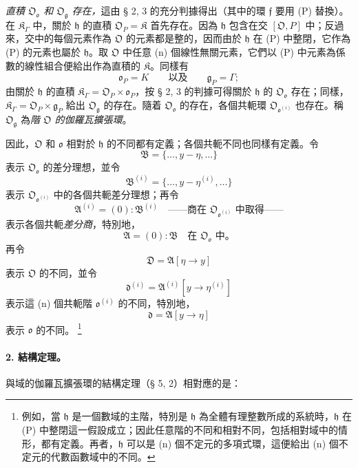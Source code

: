 \documentclass[11pt]{article}
\providecommand{\srcfn}[2]{%
  \begingroup
  \renewcommand{\thefootnote}{#1}%
  \footnote{#2}%
  \addtocounter{footnote}{-1}%
  \endgroup}
\begin{document}
\emph{直積 \(\mathfrak O_{\mathfrak o}\) 和 \(\mathfrak O_{\mathfrak g}\) 存在，}這由 § 2, 3 的充分判據得出（其中的環 \(\mathfrak f\) 要用 (P) 替換）。在 \(\mathfrak K_\Gamma\) 中，關於 \(\mathfrak h\) 的直積 \(\mathfrak O_P=\mathfrak K\) 首先存在。因為 \(\mathfrak h\) 包含在交 \([\mathfrak O,P]\) 中；反過來，交中的每個元素作為 \(\mathfrak O\) 的元素都是整的，因而由於 \(\mathfrak h\) 在 (P) 中整閉，它作為 (P) 的元素也屬於 \(\mathfrak h\)。取 \(\mathfrak O\) 中任意 (n) 個線性無關元素，它們以 (P) 中元素為係數的線性組合便給出作為直積的 \(\mathfrak K\)。同樣有
\[
\mathfrak o_P=K
\qquad\text{以及}\qquad
\mathfrak g_P=\Gamma;
\]
由關於 \(\mathfrak h\) 的直積 \(\mathfrak K_\Gamma=\mathfrak O_P\times\mathfrak o_P\)，按 § 2, 3 的判據可得關於 \(\mathfrak h\) 的 \(\mathfrak O_{\mathfrak o}\) 存在；同樣，\(\mathfrak K_\Gamma=\mathfrak O_P\times\mathfrak g_P\) 給出 \(\mathfrak O_{\mathfrak g}\) 的存在。隨着 \(\mathfrak O_{\mathfrak o}\) 的存在，各個共軛環 \(\mathfrak O_{\mathfrak o^{(i)}}\) 也存在。稱 \(\mathfrak O_{\mathfrak g}\) 為\emph{階 \(\mathfrak O\) 的伽羅瓦擴張環}。

因此，\(\mathfrak O\) 和 \(\mathfrak o\) 相對於 \(\mathfrak h\) 的不同都有定義；各個共軛不同也同樣有定義。令
\[
\mathfrak B=\{\ldots,y-\eta,\ldots\}
\]
表示 \(\mathfrak O_{\mathfrak o}\) 的差分理想，並令
\[
\mathfrak B^{(i)}=\{\ldots,y-\eta^{(i)},\ldots\}
\]
表示 \(\mathfrak O_{\mathfrak o^{(i)}}\) 中的各個共軛差分理想；再令
\[
\mathfrak A^{(i)}=(0):\mathfrak B^{(i)}
\quad\text{——商在 \(\mathfrak O_{\mathfrak o^{(i)}}\) 中取得——}
\]
表示各個共軛\emph{差分商}，特別地，
\[
\mathfrak A=(0):\mathfrak B\quad\text{在 }\mathfrak O_{\mathfrak o}\text{ 中。}
\]
再令
\[
\mathfrak D=\mathfrak A[\eta\to y]
\]
表示 \(\mathfrak O\) 的不同，並令
\[
\mathfrak d^{(i)}=\mathfrak A^{(i)}[y\to\eta^{(i)}]
\]
表示這 (n) 個共軛階 \(\mathfrak o^{(i)}\) 的不同，特別地，
\[
\mathfrak d=\mathfrak A[y\to\eta]
\]
表示 \(\mathfrak o\) 的不同。\srcfn{21)}{例如，當 \(\mathfrak h\) 是一個數域的主階，特別是 \(\mathfrak h\) 為全體有理整數所成的系統時，\(\mathfrak h\) 在 (P) 中整閉這一假設成立；因此任意階的不同和相對不同，包括相對域中的情形，都有定義。再者，\(\mathfrak h\) 可以是 (n) 個不定元的多項式環，這便給出 (n) 個不定元的代數函數域中的不同。}

\paragraph{2. 結構定理。}
與域的伽羅瓦擴張環的結構定理（§ 5, 2）相對應的是：
\end{document}

